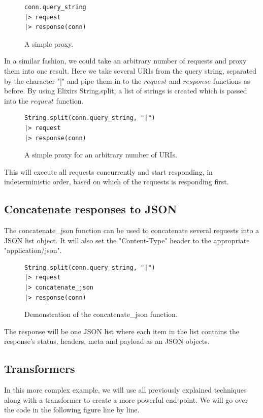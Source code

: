 \documentclass{cslthse-msc}
\begin{document}
\begin{figure}[H]
  \centering
\begin{lstlisting}[breaklines=true,frame=single]
conn.query_string
|> request
|> response(conn)
\end{lstlisting}
  \caption{A simple proxy.}
\end{figure}

In a similar fashion, we could take an arbitrary number of requests and proxy them into one result. Here we take several URIs from the query string, separated by the character "|" and pipe them in to the $request$ and $response$ functions as before. By using Elixirs String.split, a list of strings is created which is passed into the $request$ function.

\begin{figure}[H]
  \centering
\begin{lstlisting}[breaklines=true,frame=single]
String.split(conn.query_string, "|")
|> request
|> response(conn)
\end{lstlisting}
  \caption{A simple proxy for an arbitrary number of URIs.}
\end{figure}

This will execute all requests concurrently and start responding, in indeterministic order, based on which of the requests is responding first.

\subsection{Concatenate responses to JSON}
The concatenate\_json function can be used to concatenate several requests into a JSON list object. It will also set the "Content-Type" header to the appropriate "application/json".

\begin{figure}[H]
  \centering
\begin{lstlisting}[breaklines=true,frame=single]
String.split(conn.query_string, "|")
|> request
|> concatenate_json
|> response(conn)
\end{lstlisting}
  \caption{Demonstration of the concatenate\_json function.}
\end{figure}

The response will be one JSON list where each item  in the list contains the response's status, headers, meta and payload as an JSON objects.

\subsection{Transformers}
In this more complex example, we will use all previously explained techniques along with a transformer to create a more powerful end-point. We will go over the code in the following figure line by line.
\end{document}
